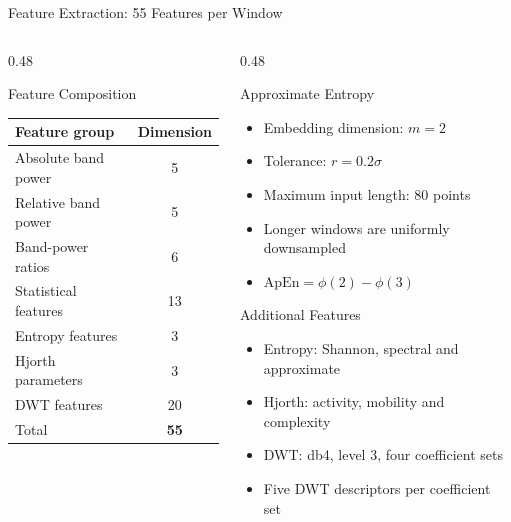\documentclass{beamer}
\begin{document}
\begin{frame}{Feature Extraction: 55 Features per Window}
  \scriptsize
  \begin{columns}[T]
    \begin{column}{0.48\textwidth}
      \begin{block}{Feature Composition}
        \begin{table}
          \centering
          \scriptsize
          \begin{tabular}{lc}
            \toprule
            Feature group & Dimension \\
            \midrule
            Absolute band power & 5 \\
            Relative band power & 5 \\
            Band-power ratios & 6 \\
            Statistical features & 13 \\
            Entropy features & 3 \\
            Hjorth parameters & 3 \\
            DWT features & 20 \\
            \midrule
            Total & \textbf{55} \\
            \bottomrule
          \end{tabular}
        \end{table}
      \end{block}
    \end{column}

    \begin{column}{0.48\textwidth}
      \begin{block}{Approximate Entropy}
        \begin{itemize}
          \item Embedding dimension: $m=2$
          \item Tolerance: $r=0.2\sigma$
          \item Maximum input length: 80 points
          \item Longer windows are uniformly downsampled
          \item $\mathrm{ApEn}=\phi(2)-\phi(3)$
        \end{itemize}
      \end{block}

      \begin{block}{Additional Features}
        \begin{itemize}
          \item Entropy: Shannon, spectral and approximate
          \item Hjorth: activity, mobility and complexity
          \item DWT: db4, level 3, four coefficient sets
          \item Five DWT descriptors per coefficient set
        \end{itemize}
      \end{block}
    \end{column}
  \end{columns}
\end{frame}
\end{document}
